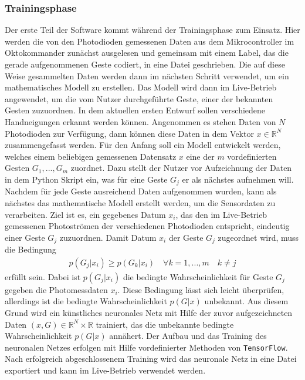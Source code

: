 \subsubsection*{Trainingsphase}
Der erste Teil der Software kommt während der Trainingsphase zum Einsatz. Hier werden die von den Photodioden gemessenen Daten aus dem Mikrocontroller im Oktokommander zunächst ausgelesen und gemeinsam mit einem Label, das die gerade aufgenommenen Geste codiert, in eine Datei geschrieben. Die auf diese Weise gesammelten Daten werden dann im nächsten Schritt verwendet, um ein mathematisches Modell zu erstellen. Das Modell wird dann im Live-Betrieb angewendet, um die vom Nutzer durchgeführte Geste, einer der bekannten Gesten zuzuordnen. In dem aktuellen ersten Entwurf sollen verschiedene Handneigungen erkannt werden können. Angenommen es stehen Daten von $N$ Photodioden zur Verfügung, dann können diese Daten in dem Vektor $x\in \mathbb{R}^N$ zusammengefasst werden. Für den Anfang soll ein Modell entwickelt werden, welches einem beliebigen gemessenen Datensatz $x$ eine der $m$ vordefinierten Gesten $G_1 , ... , G_m$ zuordnet. Dazu stellt der Nutzer vor Aufzeichnung der Daten in dem Python Skript ein, was für eine Geste $G_j$ er als nächstes aufnehmen will. Nachdem für jede Geste ausreichend Daten aufgenommen wurden, kann als nächstes das mathematische Modell erstellt werden, um die Sensordaten zu verarbeiten. Ziel ist es, ein gegebenes Datum $x_i$, das den im Live-Betrieb gemessenen Photoströmen der verschiedenen Photodioden entspricht, eindeutig einer Geste $G_j$ zuzuordnen. Damit Datum $x_i$ der Geste $G_j$ zugeordnet wird, muss die Bedingung 
\begin{align*}
	p(G_j | x_i) \geq p(G_k | x_i) \quad \forall k = 1,...,m \quad k \neq j
\end{align*}
erfüllt sein. Dabei ist $p(G_j | x_i)$ die bedingte Wahrscheinlichkeit für Geste $G_j$ gegeben die Photomessdaten $x_i$. Diese Bedingung lässt sich leicht überprüfen, allerdings ist die bedingte Wahrscheinlichkeit $p(G | x)$ unbekannt. Aus diesem Grund wird ein künstliches neuronales Netz mit Hilfe der zuvor aufgezeichneten Daten $(x,G) \in \mathbb{R}^N \times \mathbb{R}$ trainiert, das die unbekannte bedingte Wahrscheinlichkeit $p(G | x)$ annähert. Der Aufbau und das Training des neuronalen Netzes erfolgen mit Hilfe vordefinierter Methoden von \texttt{TensorFlow}\texttrademark. Nach erfolgreich abgeschlossenem Training wird das neuronale Netz in eine Datei exportiert und kann im Live-Betrieb verwendet werden.

